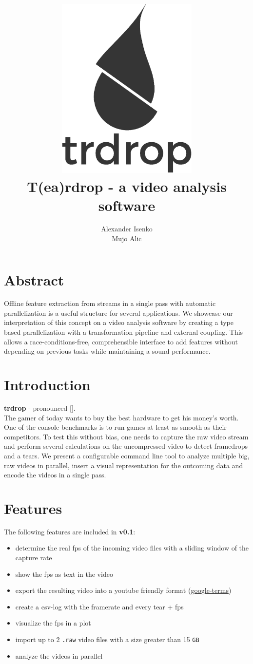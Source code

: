 \documentclass[titlepage]{article}
\title{\includegraphics[width=200pt, height=260pt]{../../images/trdrop_logo_text.eps} \\[50pt]
T(ea)rdrop - a video analysis software}
\author{Alexander Isenko\\Mujo Alic}
\date{}
\begin{document}
\maketitle

\newpage

\section{Abstract}
Offline feature extraction from streams in a single pass with automatic parallelization is a useful structure for several applications. We showcase our interpretation of this concept on a video analysis software by creating a type based parallelization with a transformation pipeline and external coupling. This allows a race-conditions-free, comprehensible interface to add features without depending on previous tasks while maintaining a sound performance.

\section{Introduction}

\textbf{trdrop} - pronounced [\textit{}]. \\[2mm]
\hfill
The gamer of today wants to buy the best hardware to get his money's worth. One of the console benchmarks is to run games at least as smooth as their competitors. To test this without bias, one needs to capture the raw video stream and perform several calculations on the uncompressed video to detect framedrops and a tears. We present a configurable command line tool to analyze multiple big, raw videos in parallel, insert a visual representation for the outcoming data and encode the videos in a single pass. 

\section{Features}

The following features are included in \textbf{v0.1}:

\begin{itemize}
    \item determine the real fps of the incoming video files with a sliding window of the capture rate
    \item show the fps as text in the video
    \item export the resulting video into a youtube friendly format (\href{https://support.google.com/youtube/answer/1722171}{google-terms})
    \item create a csv-log with the framerate and every tear + fps
    \item visualize the fps in a plot
    \item import up to 2 \texttt{.raw} video files with a size greater than 15 \texttt{GB}
        \item analyze the videos in parallel
    
\end{itemize}
\end{document}
